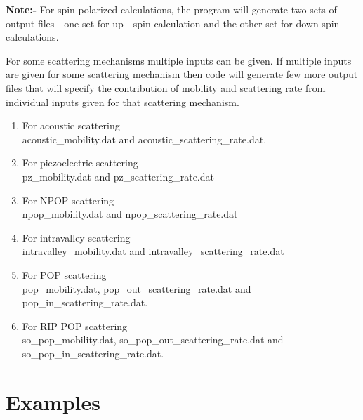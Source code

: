 \documentclass[12pt]{article}
\begin{document}
\textbf{Note:-} For spin-polarized calculations, the program will generate two sets of output files - one set for up - spin calculation and the other set for down spin calculations. 
  
For some scattering mechanisms multiple inputs can be given. If multiple inputs are given for some scattering mechanism then code will generate few  more output files that will specify the contribution of mobility and scattering rate from individual inputs given for that scattering mechanism. 

\begin{enumerate}
    \item For acoustic scattering \\ acoustic\_mobility.dat  and acoustic\_scattering\_rate.dat. \\
    
    \item For piezoelectric scattering \\ pz\_mobility.dat and pz\_scattering\_rate.dat \\
    
    \item For NPOP scattering \\ 
    npop\_mobility.dat and npop\_scattering\_rate.dat 
    
    \item For intravalley scattering \\
    intravalley\_mobility.dat and intravalley\_scattering\_rate.dat 
        
    \item For POP scattering \\
    pop\_mobility.dat, pop\_out\_scattering\_rate.dat and pop\_in\_scattering\_rate.dat.
    
    \item For RIP POP scattering \\
    so\_pop\_mobility.dat, so\_pop\_out\_scattering\_rate.dat and so\_pop\_in\_scattering\_rate.dat. 
    
\end{enumerate}

\section{Examples} \label{examples}
\end{document}
